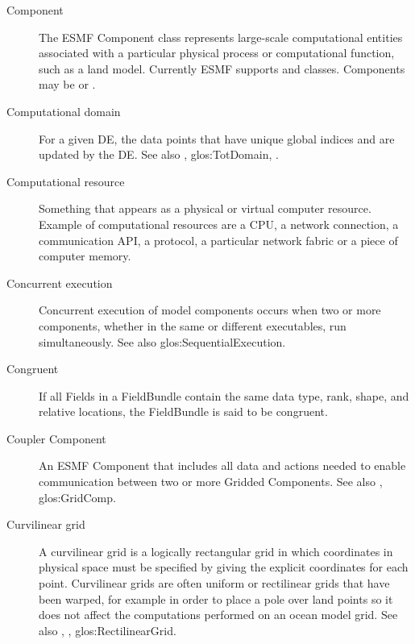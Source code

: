 \begin{description}
\label{glos:Component}
\item[Component] The ESMF Component class represents large-scale
  computational entities associated with a particular physical
  process or computational function, such as a land model.  
  Currently ESMF supports 
  and  classes.
  Components may be  or 
  .  

\label{glos:CompDomain}
\item[Computational domain] For a given DE, the data points that 
  have unique global indices and are updated by the DE.  
  See also , 
  {glos:TotDomain}, .

\label{glos:CompResource}
\item[Computational resource] Something that appears as a
  physical or virtual computer resource. Example of computational resources
  are a CPU, a network connection, a communication API, a protocol, a 
  particular network fabric or a piece of computer memory. 

\label{glos:ConcurrentExecution}
\item[Concurrent execution] 
  Concurrent execution of model components occurs when two or more components,
  whether in the same or different executables, run simultaneously.
  See also 
  {glos:SequentialExecution}.

\label{glos:Congruent}
\item[Congruent] 
  If all Fields in a FieldBundle contain the same data type, rank, shape, and 
  relative locations, the FieldBundle is said to be congruent. 

\label{glos:Coupler}
\item[Coupler Component]
  An ESMF Component that includes all data and actions needed to enable 
  communication between two or more Gridded Components. 
  See also , 
  {glos:GridComp}. 

\label{glos:CurvilinearGrid}
\item[Curvilinear grid]
  A curvilinear grid is a logically rectangular grid in which 
  coordinates in physical space must be specified by giving 
  the explicit coordinates for each point.  Curvilinear
  grids are often uniform or rectilinear grids that have been 
  warped, for example in order to place a pole over land points
  so it does not affect the computations performed on an
  ocean model grid.  See also 
  ,
  , 
  {glos:RectilinearGrid}.  
  

\end{description}
